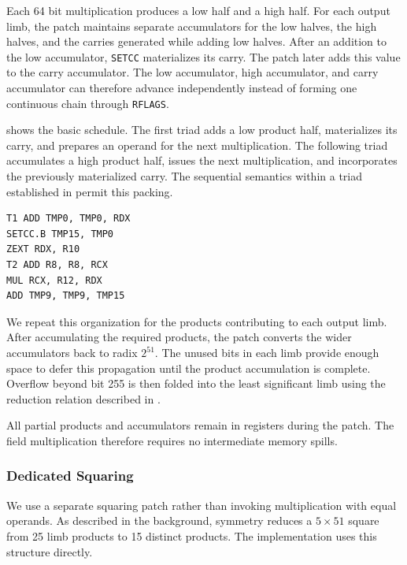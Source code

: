 \documentclass[journal=tches,submission]{iacrtrans}
\newcommand{\code}[1]{\texttt{#1}}
\newcommand{\uop}[1]{\code{\textmu#1}}%
\begin{document}
Each 64 bit multiplication produces a low half and a high half.
For each output limb, the patch maintains separate accumulators for the low halves, the high halves, and the carries generated while adding low halves.
After an addition to the low accumulator, \uop{SETCC} materializes its carry.
The patch later adds this value to the carry accumulator.
The low accumulator, high accumulator, and carry accumulator can therefore advance independently instead of forming one continuous chain through \code{RFLAGS}.

 shows the basic schedule.
The first triad adds a low product half, materializes its carry, and prepares an operand for the next multiplication.
The following triad accumulates a high product half, issues the next multiplication, and incorporates the previously materialized carry.
The sequential semantics within a triad established in  permit this packing.

\begin{lstlisting}[caption={Two triads from the $5\times51$ multiplication schedule. \code{TMP0} accumulates low halves, \code{R8} accumulates high halves, and \code{TMP9} accumulates carries from the low half additions.},label={lst}]
T1 ADD TMP0, TMP0, RDX
SETCC.B TMP15, TMP0
ZEXT RDX, R10
T2 ADD R8, R8, RCX
MUL RCX, R12, RDX
ADD TMP9, TMP9, TMP15
\end{lstlisting}

We repeat this organization for the products contributing to each output limb.
After accumulating the required products, the patch converts the wider accumulators back to radix $2^{51}$.
The unused bits in each limb provide enough space to defer this propagation until the product accumulation is complete.
Overflow beyond bit 255 is then folded into the least significant limb using the reduction relation described in .

All partial products and accumulators remain in registers during the patch.
The field multiplication therefore requires no intermediate memory spills.

\subsubsection{Dedicated Squaring}
\label{sec}

We use a separate squaring patch rather than invoking multiplication with equal operands.
As described in the background, symmetry reduces a $5\times51$ square from 25 limb products to 15 distinct products.
The implementation uses this structure directly.
\end{document}
